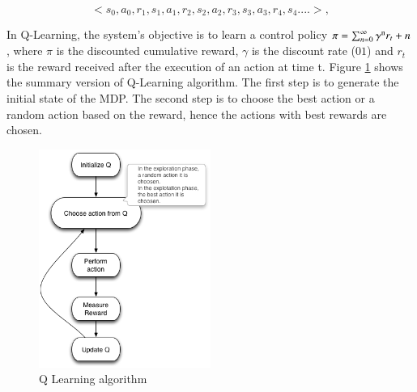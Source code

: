 \documentclass{report}
\begin{document}
\begin{equation}
<s_{0},a_{0},r_{1},s_{1},a_{1},r_{2},s_{2},a_{2},r_{3},s_{3},a_{3},r_{4},s_{4}....>,
\end{equation}


In Q-Learning, the system's objective is to learn a control policy $\pi = \sum_{n=0}^{\infty} \gamma\textsuperscript{n}  r_{t}+n $, where $\pi$  is the discounted cumulative reward, $\gamma$ is the discount rate ($01$) and $r_{t}$ is the reward received after  the execution of an action at time t. Figure \ref{fig:qalgo} shows the summary version of Q-Learning algorithm. The first step is to generate the initial state of the MDP. The second step is to choose the best action or a random action based on the reward, hence the actions with best rewards are chosen.

\begin{figure}[!h]
\centering
\includegraphics[width=0.5\textwidth]{./images/qalgo.png}
\caption{Q Learning algorithm}
\label{fig:qalgo}
\end{figure}
\end{document}
